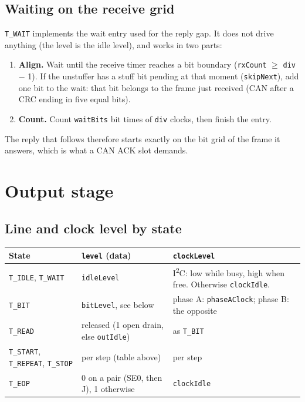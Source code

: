 \documentclass[11pt,a4paper]{article}
\newcommand{\sig}[1]{\texttt{#1}}
\begin{document}
\subsection{Waiting on the receive grid}

\sig{T\_WAIT} implements the wait entry used for the reply gap. It does not drive anything (the level is the idle level), and works in two parts:

\begin{enumerate}
\item \textbf{Align.} Wait until the receive timer reaches a bit boundary (\sig{rxCount} $\ge$ \sig{div} $-$ 1). If the unstuffer has a stuff bit pending at that moment (\sig{skipNext}), add one bit to the wait: that bit belongs to the frame just received (CAN after a CRC ending in five equal bits).
\item \textbf{Count.} Count \sig{waitBits} bit times of \sig{div} clocks, then finish the entry.
\end{enumerate}

The reply that follows therefore starts exactly on the bit grid of the frame it answers, which is what a CAN ACK slot demands.

\section{Output stage}\label{sec:levels}

\subsection{Line and clock level by state}

\begin{center}
\begin{tabularx}{\linewidth}{@{}l l L@{}}
\toprule
State & \sig{level} (data) & \sig{clockLevel} \\
\midrule
\sig{T\_IDLE}, \sig{T\_WAIT} & \sig{idleLevel} & I\textsuperscript{2}C: low while busy, high when free. Otherwise \sig{clockIdle}. \\
\sig{T\_BIT} & \sig{bitLevel}, see below & phase A: \sig{phaseAClock}; phase B: the opposite \\
\sig{T\_READ} & released (1 open drain, else \sig{outIdle}) & as \sig{T\_BIT} \\
\sig{T\_START}, \sig{T\_REPEAT}, \sig{T\_STOP} & per step (table above) & per step \\
\sig{T\_EOP} & 0 on a pair (SE0, then J), 1 otherwise & \sig{clockIdle} \\
\bottomrule
\end{tabularx}
\end{center}
\end{document}
